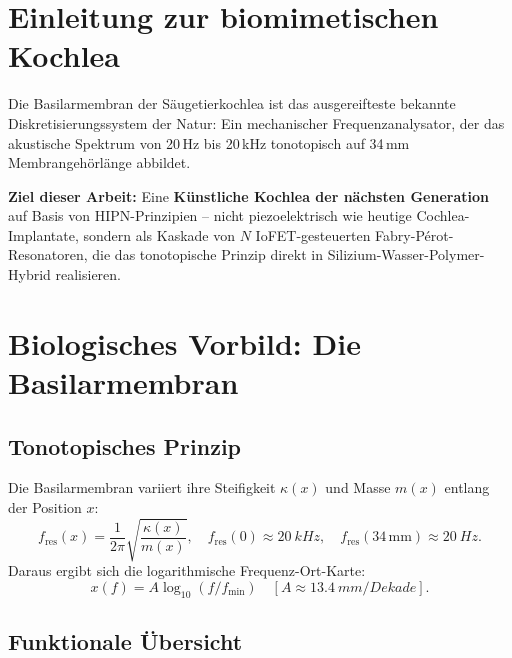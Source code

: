 ﻿\documentclass[a4paper,12pt]{scrreprt}
\theoremstyle{definition}
\begin{document}
\section{Einleitung zur biomimetischen Kochlea}

Die Basilarmembran der Säugetierkochlea ist das ausgereifteste bekannte
Diskretisierungssystem der Natur: Ein mechanischer Frequenzanalysator,
der das akustische Spektrum von 20\,Hz bis 20\,kHz tonotopisch auf
34\,mm Membrangehörlänge abbildet.

\textbf{Ziel dieser Arbeit:} Eine \textbf{Künstliche Kochlea der nächsten
Generation} auf Basis von HIPN-Prinzipien -- nicht piezoelektrisch wie
heutige Cochlea-Implantate, sondern als Kaskade von
$N$ IoFET-gesteuerten Fabry-Pérot-Resonatoren, die das tonotopische
Prinzip direkt in Silizium-Wasser-Polymer-Hybrid realisieren.

\section{Biologisches Vorbild: Die Basilarmembran}

\subsection{Tonotopisches Prinzip}

Die Basilarmembran variiert ihre Steifigkeit $\kappa(x)$ und Masse
$m(x)$ entlang der Position $x$:
\[
  f_{\mathrm{res}}(x) = \frac{1}{2\pi}\sqrt{\frac{\kappa(x)}{m(x)}},
  \quad f_{\mathrm{res}}(0) \approx \SI{20}{kHz},\quad
  f_{\mathrm{res}}(34\,\mathrm{mm}) \approx \SI{20}{Hz}.
\]
Daraus ergibt sich die logarithmische Frequenz-Ort-Karte:
\[
  x(f) = A\log_{10}(f/f_{\min}) \quad [A \approx \SI{13.4}{mm/Dekade}].
\]

\subsection{Funktionale Übersicht}
\end{document}

